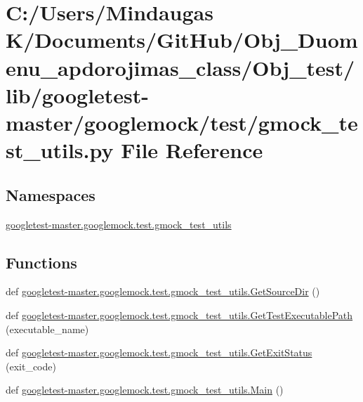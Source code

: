 \hypertarget{_obj__test_2lib_2googletest-master_2googlemock_2test_2gmock__test__utils_8py}{}\section{C\+:/\+Users/\+Mindaugas K/\+Documents/\+Git\+Hub/\+Obj\+\_\+\+Duomenu\+\_\+apdorojimas\+\_\+class/\+Obj\+\_\+test/lib/googletest-\/master/googlemock/test/gmock\+\_\+test\+\_\+utils.py File Reference}
\label{_obj__test_2lib_2googletest-master_2googlemock_2test_2gmock__test__utils_8py}
\subsection*{Namespaces}
\begin{DoxyCompactItemize}
\item 
 \mbox{\hyperlink{namespacegoogletest-master_1_1googlemock_1_1test_1_1gmock__test__utils}{googletest-\/master.\+googlemock.\+test.\+gmock\+\_\+test\+\_\+utils}}
\end{DoxyCompactItemize}
\subsection*{Functions}
\begin{DoxyCompactItemize}
\item 
def \mbox{\hyperlink{namespacegoogletest-master_1_1googlemock_1_1test_1_1gmock__test__utils_aa53045749b50257c5ffcbbb33d7a28b9}{googletest-\/master.\+googlemock.\+test.\+gmock\+\_\+test\+\_\+utils.\+Get\+Source\+Dir}} ()
\item 
def \mbox{\hyperlink{namespacegoogletest-master_1_1googlemock_1_1test_1_1gmock__test__utils_a96f12a02ddad3510eb506e45a7aeb27b}{googletest-\/master.\+googlemock.\+test.\+gmock\+\_\+test\+\_\+utils.\+Get\+Test\+Executable\+Path}} (executable\+\_\+name)
\item 
def \mbox{\hyperlink{namespacegoogletest-master_1_1googlemock_1_1test_1_1gmock__test__utils_abc18127285188c1521e883b493486e11}{googletest-\/master.\+googlemock.\+test.\+gmock\+\_\+test\+\_\+utils.\+Get\+Exit\+Status}} (exit\+\_\+code)
\item 
def \mbox{\hyperlink{namespacegoogletest-master_1_1googlemock_1_1test_1_1gmock__test__utils_a66f3908daa336c8cc507730bcd64bb5f}{googletest-\/master.\+googlemock.\+test.\+gmock\+\_\+test\+\_\+utils.\+Main}} ()
\end{DoxyCompactItemize}
